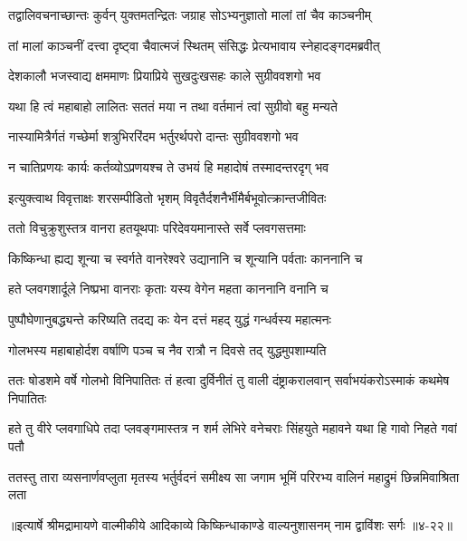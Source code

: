\twolineshloka
{तद्वालिवचनाच्छान्तः कुर्वन् युक्तमतन्द्रितः}
{जग्राह सोऽभ्यनुज्ञातो मालां तां चैव काञ्चनीम्} %

\twolineshloka
{तां मालां काञ्चनीं दत्त्वा दृष्ट्वा चैवात्मजं स्थितम्}
{संसिद्धः प्रेत्यभावाय स्नेहादङ्गदमब्रवीत्} %

\twolineshloka
{देशकालौ भजस्वाद्य क्षममाणः प्रियाप्रिये}
{सुखदुःखसहः काले सुग्रीववशगो भव} %

\twolineshloka
{यथा हि त्वं महाबाहो लालितः सततं मया}
{न तथा वर्तमानं त्वां सुग्रीवो बहु मन्यते} %

\twolineshloka
{नास्यामित्रैर्गतं गच्छेर्मा शत्रुभिररिंदम}
{भर्तुरर्थपरो दान्तः सुग्रीववशगो भव} %

\twolineshloka
{न चातिप्रणयः कार्यः कर्तव्योऽप्रणयश्च ते}
{उभयं हि महादोषं तस्मादन्तरदृग् भव} %

\twolineshloka
{इत्युक्त्वाथ विवृत्ताक्षः शरसम्पीडितो भृशम्}
{विवृतैर्दशनैर्भीमैर्बभूवोत्क्रान्तजीवितः} %

\twolineshloka
{ततो विचुक्रुशुस्तत्र वानरा हतयूथपाः}
{परिदेवयमानास्ते सर्वे प्लवगसत्तमाः} %

\twolineshloka
{किष्किन्धा ह्यद्य शून्या च स्वर्गते वानरेश्वरे}
{उद्यानानि च शून्यानि पर्वताः काननानि च} %

\twolineshloka
{हते प्लवगशार्दूले निष्प्रभा वानराः कृताः}
{यस्य वेगेन महता काननानि वनानि च} %

\twolineshloka
{पुष्पौघेणानुबद्ध्यन्ते करिष्यति तदद्य कः}
{येन दत्तं महद् युद्धं गन्धर्वस्य महात्मनः} %

\twolineshloka
{गोलभस्य महाबाहोर्दश वर्षाणि पञ्च च}
{नैव रात्रौ न दिवसे तद् युद्धमुपशाम्यति} %

\threelineshloka
{ततः षोडशमे वर्षे गोलभो विनिपातितः}
{तं हत्वा दुर्विनीतं तु वाली दंष्ट्राकरालवान्}
{सर्वाभयंकरोऽस्माकं कथमेष निपातितः} %

\twolineshloka
{हते तु वीरे प्लवगाधिपे तदा प्लवङ्गमास्तत्र न शर्म लेभिरे}
{वनेचराः सिंहयुते महावने यथा हि गावो निहते गवां पतौ} %

\twolineshloka
{ततस्तु तारा व्यसनार्णवप्लुता मृतस्य भर्तुर्वदनं समीक्ष्य सा}
{जगाम भूमिं परिरभ्य वालिनं महाद्रुमं छिन्नमिवाश्रिता लता} %


॥इत्यार्षे श्रीमद्रामायणे वाल्मीकीये आदिकाव्ये किष्किन्धाकाण्डे वाल्यनुशासनम् नाम द्वाविंशः सर्गः ॥४-२२॥
